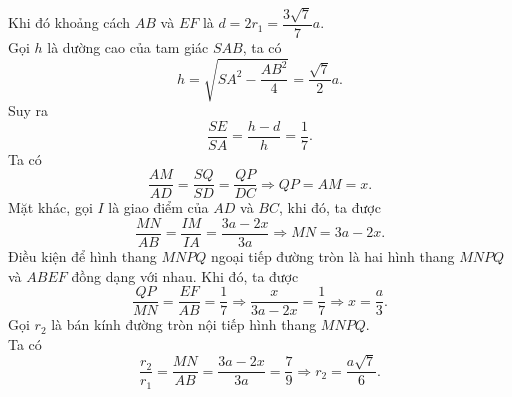 \begin{ex}
{		 Khi đó khoảng cách $AB$ và $EF$ là $d=2r_1=\dfrac{3\sqrt{7}}{7}a$.\\
		Gọi $h$ là dường cao của tam giác $SAB$,  ta có
		\[h=\sqrt{SA^2-\dfrac{AB^2}{4}}=\dfrac{\sqrt{7}}{2}a. \] 
		Suy  ra
		\[\dfrac{SE}{SA}=\dfrac{h-d}{h}=\dfrac{1}{7}.\] 
		Ta  có
		\[\dfrac{AM}{AD}=\dfrac{SQ}{SD}=\dfrac{QP}{DC}\Rightarrow  QP=AM=x.\]
		Mặt khác,  gọi $I$ là giao điểm của $AD$ và $BC$, khi đó, ta được
		\[\dfrac{MN}{AB}=\dfrac{IM}{IA}=\dfrac{3a-2x}{3a}\Rightarrow  MN=3a-2x.\]
		Điều kiện để hình thang $MNPQ$ ngoại tiếp đường tròn là hai hình thang $MNPQ$ và $ABEF$  đồng dạng với nhau. Khi đó, ta được
		 \[\dfrac{QP}{MN}=\dfrac{EF}{AB}=\dfrac{1}{7}\Rightarrow\dfrac{x}{3a-2x}=\dfrac{1}{7}\Rightarrow x=\dfrac{a}{3}.\]
		Gọi $r_2$ là bán kính  đường tròn nội tiếp hình thang $MNPQ$.\\
		 Ta có
		\[\dfrac{r_2}{r_1}=\dfrac{MN}{AB}=\dfrac{3a-2x}{3a}=\dfrac{7}{9}\Rightarrow  r_2=\dfrac{a\sqrt{7}}{6}.\]
	} 
\end{ex}




